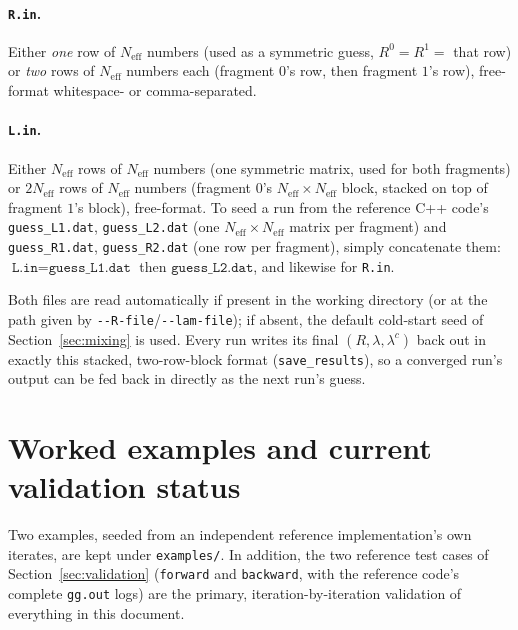 \documentclass[11pt]{article}
\newcommand{\Neff}{N_{\mathrm{eff}}}
\begin{document}
\paragraph{\texttt{R.in}.} Either \emph{one} row of $\Neff$ numbers
(used as a symmetric guess, $R^0=R^1=$ that row) or \emph{two} rows of
$\Neff$ numbers each (fragment $0$'s row, then fragment $1$'s row), free-format
whitespace- or comma-separated.

\paragraph{\texttt{L.in}.} Either $\Neff$ rows of $\Neff$ numbers (one
symmetric matrix, used for both fragments) or $2\Neff$ rows of $\Neff$
numbers (fragment $0$'s $\Neff\times\Neff$ block, stacked on top of fragment
$1$'s block), free-format. To seed a run from the reference C++ code's
\texttt{guess\_L1.dat}, \texttt{guess\_L2.dat} (one $\Neff\times\Neff$ matrix per
fragment) and \texttt{guess\_R1.dat}, \texttt{guess\_R2.dat} (one row per
fragment), simply concatenate them: $\texttt{L.in}=\texttt{guess\_L1.dat}$ then
$\texttt{guess\_L2.dat}$, and likewise for \texttt{R.in}.

Both files are read automatically if present in the working directory (or at
the path given by \texttt{-{}-R-file}/\texttt{-{}-lam-file}); if absent, the
default cold-start seed of Section~\ref{sec:mixing} is used. Every run
writes its final $(R,\lambda,\lambda^c)$ back out in exactly this stacked,
two-row-block format (\texttt{save\_results}), so a converged run's output
can be fed back in directly as the next run's guess.

\section{Worked examples and current validation status}
\label{sec:examples}

Two examples, seeded from an independent reference implementation's own
iterates, are kept under \texttt{examples/}. In addition, the two
reference test cases of Section~\ref{sec:validation} (\texttt{forward} and
\texttt{backward}, with the reference code's complete \texttt{gg.out} logs)
are the primary, iteration-by-iteration validation of everything in this
document.
\end{document}
